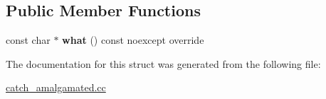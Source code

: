 \subsection*{Public Member Functions}
\begin{DoxyCompactItemize}
\item 
\mbox{\label{structCatch_1_1Benchmark_1_1Detail_1_1optimized__away__error_a77667d73ffbd8b79a29c638000cf7990}} 
const char $\ast$ {\bfseries what} () const noexcept override
\end{DoxyCompactItemize}


The documentation for this struct was generated from the following file\+:\begin{DoxyCompactItemize}
\item 
\hyperlink{catch__amalgamated_8cc}{catch\+\_\+amalgamated.\+cc}\end{DoxyCompactItemize}
